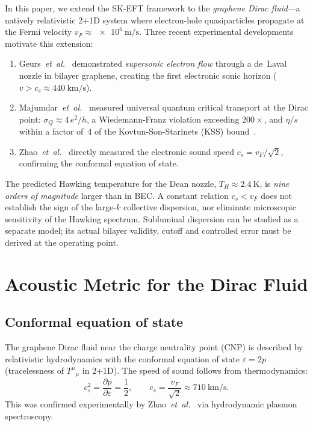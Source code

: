 \documentclass[aps,prd,twocolumn,showpacs,superscriptaddress,nofootinbib]{revtex4-2}
\begin{document}
In this paper, we extend the SK-EFT framework to the \emph{graphene Dirac
fluid}---a natively relativistic 2+1D system where electron-hole
quasiparticles propagate at the Fermi velocity $v_F \approx
\SI{e6}{\meter/\second}$. Three recent experimental developments motivate
this extension:
\begin{enumerate}
\item Geurs~\textit{et~al.}~\cite{Geurs2025} demonstrated \emph{supersonic
electron flow} through a de~Laval nozzle in bilayer graphene, creating the
first electronic sonic horizon ($v > c_s \approx \SI{440}{\kilo\meter/\second}$).
\item Majumdar~\textit{et~al.}~\cite{Majumdar2025} measured universal quantum
critical transport at the Dirac point: $\sigma_Q \approx 4\,e^2/h$, a
Wiedemann-Franz violation exceeding $200\times$, and $\eta/s$ within a factor
of~4 of the Kovtun-Son-Starinets (KSS) bound~\cite{KSS2005}.
\item Zhao~\textit{et~al.}~\cite{Zhao2023} directly measured the electronic
sound speed $c_s = v_F/\sqrt{2}$, confirming the conformal equation of state.
\end{enumerate}

The predicted Hawking temperature for the Dean nozzle, $T_H \approx
\SI{2.4}{\kelvin}$, is \emph{nine orders of magnitude} larger than in BEC.
A constant relation $c_s<v_F$ does not establish the sign of the
large-$k$ collective dispersion, nor eliminate microscopic sensitivity
of the Hawking spectrum. Subluminal dispersion can be studied as a
separate model; its actual bilayer validity, cutoff and controlled error
must be derived at the operating point.

\section{Acoustic Metric for the Dirac Fluid}
\label{sec:metric}

\subsection{Conformal equation of state}

The graphene Dirac fluid near the charge neutrality point (CNP) is described
by relativistic hydrodynamics with the conformal equation of state
$\varepsilon = 2p$ (tracelessness of $T^\mu{}_\mu$ in 2+1D). The speed of
sound follows from thermodynamics:
\begin{equation}
c_s^2 = \frac{\partial p}{\partial \varepsilon} = \frac{1}{2}, \qquad
c_s = \frac{v_F}{\sqrt{2}} \approx \SI{710}{\kilo\meter/\second}.
\label{eq:sound_speed}
\end{equation}
This was confirmed experimentally by Zhao~\textit{et~al.}~\cite{Zhao2023}
via hydrodynamic plasmon spectroscopy.
\end{document}
